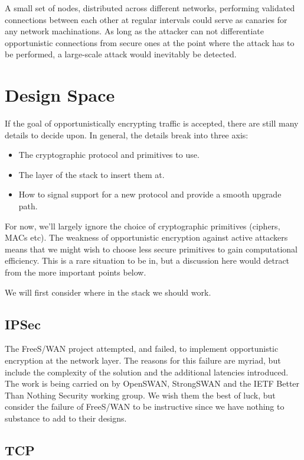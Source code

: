 \documentclass[conference]{IEEEtran}
\begin{document}
A small set of nodes, distributed across different networks, performing
validated connections between each other at regular intervals could serve as
canaries for any network machinations. As long as the attacker can not
differentiate opportunistic connections from secure ones at the point where the
attack has to be performed, a large-scale attack would inevitably be detected.

\section{Design Space}

If the goal of opportunistically encrypting traffic is accepted, there are
still many details to decide upon. In general, the details break into three
axis:

\begin{itemize}
\item The cryptographic protocol and primitives to use.
\item The layer of the stack to insert them at.
\item How to signal support for a new protocol and provide a smooth upgrade path.
\end{itemize}

For now, we'll largely ignore the choice of cryptographic primitives (ciphers,
MACs etc). The weakness of opportunistic encryption against active attackers
means that we might wish to choose less secure primitives to gain computational
efficiency. This is a rare situation to be in, but a discussion here would
detract from the more important points below.

We will first consider where in the stack we should work.

\subsection{IPSec}

The FreeS/WAN project\cite{freeswan} attempted, and
failed\cite{freeswanfailure}, to implement
opportunistic encryption at the network layer. The reasons for this failure are
myriad, but include the complexity of the solution and the additional latencies
introduced. The work is being carried on by OpenSWAN, StrongSWAN and the IETF
Better Than Nothing Security working group\cite{btns}. We wish them the best of
luck, but consider the failure of FreeS/WAN to be instructive since we have
nothing to substance to add to their designs.

\subsection{TCP}
\end{document}
